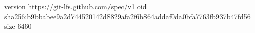 version https://git-lfs.github.com/spec/v1
oid sha256:b9bbabee9a2d744520142d8829afa2f6b864addaf0da0bfa7763fb937b47fd56
size 6460
